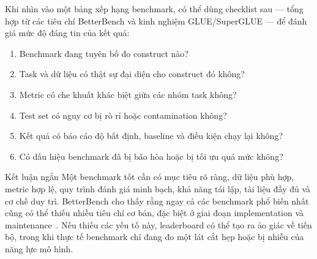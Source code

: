 Khi nhìn vào một bảng xếp hạng benchmark, có thể dùng checklist sau --- tổng hợp từ các tiêu chí BetterBench và kinh nghiệm GLUE/SuperGLUE --- để đánh giá mức độ đáng tin của kết quả:

\begin{enumerate}
    \item Benchmark đang tuyên bố đo construct nào?
    \item Task và dữ liệu có thật sự đại diện cho construct đó không?
    \item Metric có che khuất khác biệt giữa các nhóm task không?
    \item Test set có nguy cơ bị rò rỉ hoặc contamination không?
    \item Kết quả có báo cáo độ bất định, baseline và điều kiện chạy lại không?
    \item Có dấu hiệu benchmark đã bị bão hòa hoặc bị tối ưu quá mức không?
\end{enumerate}

\begin{summarybox}{Kết luận ngắn}
Một benchmark tốt cần có mục tiêu rõ ràng, dữ liệu phù hợp, metric hợp lệ, quy trình đánh giá minh bạch, khả năng tái lập, tài liệu đầy đủ và cơ chế duy trì. BetterBench cho thấy rằng ngay cả các benchmark phổ biến nhất cũng có thể thiếu nhiều tiêu chí cơ bản, đặc biệt ở giai đoạn implementation và maintenance~\cite{betterbench}. Nếu thiếu các yếu tố này, leaderboard có thể tạo ra ảo giác về tiến bộ, trong khi thực tế benchmark chỉ đang đo một lát cắt hẹp hoặc bị nhiễu của năng lực mô hình.
\end{summarybox}